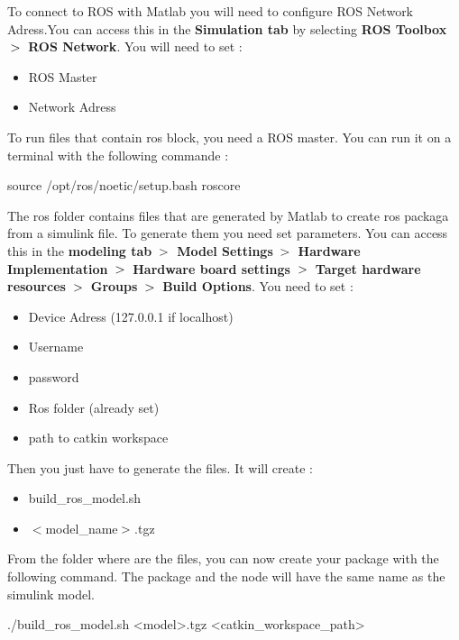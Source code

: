 \bigbreak
To connect to ROS with Matlab you will need to configure ROS Network Adress.You can access this in the \textbf{Simulation tab} by selecting \textbf{ROS Toolbox} $\bg$ \textbf{ROS Network}. You will need to set :
\begin{multicols}{2}
    \begin{itemize}[noitemsep]
        \item ROS Master
        \item Network Adress
    \end{itemize}
\end{multicols}

\bigbreak
To run files that contain ros block, you need a ROS master. You can run it on a terminal with the following commande :
\begin{commandshell}
    source /opt/ros/noetic/setup.bash
    roscore
\end{commandshell} 

\bigbreak
The ros folder contains files that are generated by Matlab to create ros packaga from a simulink file. To generate them you need set parameters. You can access this in the \textbf{modeling tab} $\bg$ \textbf{Model Settings} $\bg$ \textbf{Hardware Implementation} $\bg$ \textbf{Hardware board settings} $\bg$ \textbf{Target hardware resources} $\bg$ \textbf{Groups} $\bg$ \textbf{Build Options}. You need to set :
\begin{itemize}[noitemsep]
    \item Device Adress (127.0.0.1 if localhost)
    \item Username
    \item password
    \item Ros folder (already set)
    \item path to catkin workspace
\end{itemize}

\bigbreak
Then you just have to generate the files. It will create :
\begin{multicols}{2}
    \begin{itemize}[noitemsep]
        \item build\_ros\_model.sh
        \item $\less$model\_name$\bg$.tgz
    \end{itemize}
\end{multicols}


\bigbreak
From the folder where are the files, you can now create your package with the following command. The package and the node will have the same name as the simulink model.
\begin{commandshell}
    ./build_ros_model.sh <model>.tgz <catkin_workspace_path>
\end{commandshell} 



